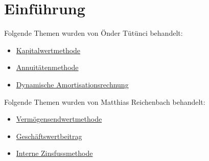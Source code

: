 \chapter{Einführung}
\label{Einfuehrung}

Folgende Themen wurden von Önder Tütünci behandelt:

\begin{itemize}
    \item \hyperref[Kapitalwertmethode]{Kapitalwertmethode}
    \item \hyperref[Annuitaetenmethode]{Annuitätenmethode}
    \item \hyperref[Dynamische Amortisationsrechnung]{Dynamische Amortisationsrechnung}
\end{itemize}
Folgende Themen wurden von Matthias Reichenbach behandelt:

\begin{itemize}
    \item \hyperref[Vermoegensendwertmethode]{Vermögensendwertmethode}
    \item \hyperref[Geschaeftswertbeitrag ]{Geschäftswertbeitrag}
    \item \hyperref[Interne Zinsfussmethode]{Interne Zinsfussmethode}
\end{itemize}
